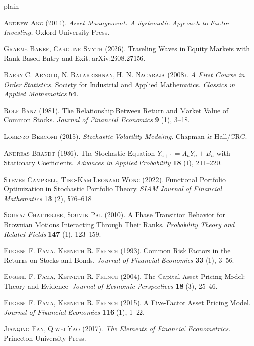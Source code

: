 \documentclass[12pt]{amsart}
\begin{document}
\begin{thebibliography}{plain}

 \textsc{Andrew Ang} (2014). \textit{Asset Management. A Systematic Approach to Factor Investing.} Oxford University Press.

 \textsc{Graeme Baker, Caroline Smyth} (2026). Traveling Waves in Equity Markets with Rank-Based Entry and Exit. arXiv:2608.27156. 

 \textsc{Barry C. Arnold, N. Balakrishnan, H. N. Nagaraja} (2008). \textit{A First Course in Order Statistics.} Society for Industrial and Applied Mathematics. {\it Classics in Applied Mathematics} \textbf{54}.

 \textsc{Rolf Banz} (1981). The Relationship Between Return and Market Value of Common Stocks. {\it Journal of Financial Economics} \textbf{9} (1), 3--18.

 \textsc{Lorenzo Bergomi}  (2015). \textit{Stochastic Volatility Modeling}. Chapman \& Hall/CRC.

 \textsc{Andreas Brandt} (1986). The Stochastic Equation $Y_{n+1}=A_nY_n+B_n$ with Stationary Coefficients. \textit{Advances in Applied Probability} \textbf{18} (1), 211--220.

 \textsc{Steven Campbell, Ting-Kam Leonard Wong} (2022). Functional Portfolio Optimization in Stochastic Portfolio Theory. \textit{SIAM Journal of Financial Mathematics} \textbf{13} (2), 576--618.

 \textsc{Sourav Chatterjee, Soumik Pal} (2010). A Phase Transition Behavior for Brownian Motions Interacting Through Their Ranks. \textit{Probability Theory and Related Fields} \textbf{147} (1), 123--159. 

 \textsc{Eugene F. Fama, Kenneth R. French} (1993). Common Risk Factors in the Returns on Stocks and Bonds. \textit{Journal of Financial Economics} \textbf{33} (1), 3--56. 

 \textsc{Eugene F. Fama, Kenneth R. French} (2004). The Capital Asset Pricing Model: Theory and Evidence. \textit{Journal of Economic Perspectives} \textbf{18} (3), 25--46.

 \textsc{Eugene F. Fama, Kenneth R. French} (2015). A Five-Factor Asset Pricing Model. \textit{Journal of Financial Economics} \textbf{116} (1), 1--22. 

 \textsc{Jianqing Fan, Qiwei Yao} (2017). \textit{The Elements of Financial Econometrics}. Princeton University Press.


\end{thebibliography}
\end{document}
